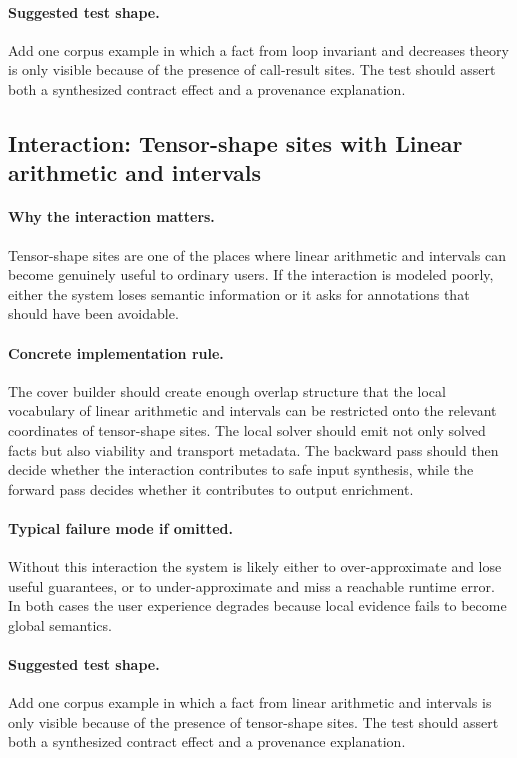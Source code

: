 \documentclass[11pt]{report}
\theoremstyle{definition}
\theoremstyle{plain}
\begin{document}
\paragraph{Suggested test shape.}
Add one corpus example in which a fact from loop invariant and decreases theory is only
visible because of the presence of call-result sites. The test should
assert both a synthesized contract effect and a provenance explanation.

\subsection{Interaction: Tensor-shape sites with Linear arithmetic and intervals}

\paragraph{Why the interaction matters.}
Tensor-shape sites are one of the places where linear arithmetic and intervals can become
genuinely useful to ordinary users. If the interaction is modeled poorly,
either the system loses semantic information or it asks for annotations that
should have been avoidable.

\paragraph{Concrete implementation rule.}
The cover builder should create enough overlap structure that the local
vocabulary of linear arithmetic and intervals can be restricted onto the relevant
coordinates of tensor-shape sites. The local solver should emit not only
solved facts but also viability and transport metadata. The backward pass
should then decide whether the interaction contributes to safe input
synthesis, while the forward pass decides whether it contributes to output
enrichment.

\paragraph{Typical failure mode if omitted.}
Without this interaction the system is likely either to over-approximate and
lose useful guarantees, or to under-approximate and miss a reachable runtime
error. In both cases the user experience degrades because local evidence
fails to become global semantics.

\paragraph{Suggested test shape.}
Add one corpus example in which a fact from linear arithmetic and intervals is only
visible because of the presence of tensor-shape sites. The test should
assert both a synthesized contract effect and a provenance explanation.
\end{document}
